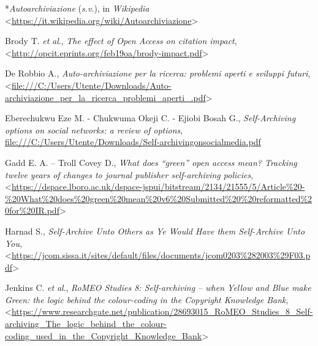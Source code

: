 \documentclass[
  b5paper,
  twoside,
  12pt,
  chapterprefix=false,
  bibliography=totocnumbered,
  parskip=false]{scrbook}
\begin{document}
*\emph{Autoarchiviazione} (\emph{s.v}.), in \emph{Wikipedia}
\textless{}\href{https://it.wikipedia.org/wiki/Autoarchiviazione}{{https://it.wikipedia.org/wiki/Autoarchiviazione}}\textgreater{}

Brody T. \emph{et} \emph{al}., \emph{The effect of Open Access on citation impact},
\textless{}\href{http://opcit.eprints.org/feb19oa/brody-impact.pdf}{{http://opcit.eprints.org/feb19oa/brody-impact.pdf}}\textgreater{}

De Robbio A., \emph{Auto-archiviazione per la ricerca: problemi aperti e
sviluppi futuri},
\textless{}\href{file:///C:/Users/Utente/Downloads/Auto-archiviazione_per_la_ricerca_problemi_aperti_.pdf}{{file:///C:/Users/Utente/Downloads/Auto-archiviazione\_per\_la\_ricerca\_problemi\_aperti\_.pdf}}\textgreater{}

Eberechukwu Eze M. - Chukwuma Okeji C. - Ejiobi Bosah G.,
\emph{Self-Archiving options on social networks: a review of options},
\href{file:///C:/Users/Utente/Downloads/Self-archivingonsocialmedia.pdf}{{file:///C:/Users/Utente/Downloads/Self-archivingonsocialmedia.pdf}}

Gadd E. A. -- Troll Covey D., \emph{What does \enquote{green} open access mean?
Tracking twelve years of changes to journal publisher self-archiving
policies},
\textless{}\href{https://dspace.lboro.ac.uk/dspace-jspui/bitstream/2134/21555/5/Article\%20-\%20What\%20does\%20green\%20mean\%20v6\%20Submitted\%20\%20reformatted\%20for\%20IR.pdf}{{https://dspace.lboro.ac.uk/dspace-jspui/bitstream/2134/21555/5/Article\%20-\%20What\%20does\%20green\%20mean\%20v6\%20Submitted\%20\%20reformatted\%20for\%20IR.pdf}}\textgreater{}

Harnad S., \emph{Self-Archive Unto Others as Ye Would Have them Self-Archive
Unto You,}
\textless{}\href{https://jcom.sissa.it/sites/default/files/documents/jcom0203\%282003\%29F03.pdf}{{https://jcom.sissa.it/sites/default/files/documents/jcom0203\%282003\%29F03.pdf}}\textgreater{}

Jenkins C. \emph{et} \emph{al}., \emph{RoMEO Studies 8: Self-archiving -- when Yellow
and Blue make Green: the logic behind the colour-coding in the Copyright
Knowledge Bank},
\textless{}\href{https://www.researchgate.net/publication/28693015_RoMEO_Studies_8_Self-archiving_The_logic_behind_the_colour-coding_used_in_the_Copyright_Knowledge_Bank}{{https://www.researchgate.net/publication/28693015\_RoMEO\_Studies\_8\_Self-archiving\_The\_logic\_behind\_the\_colour-coding\_used\_in\_the\_Copyright\_Knowledge\_Bank}}\textgreater{}
\end{document}
